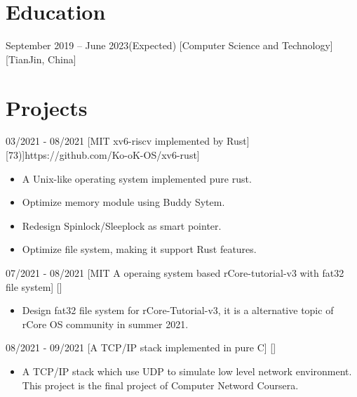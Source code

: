 \documentclass{chicv}
\begin{document}
\begin{basicinfo}
\end{basicinfo}

\section{Education}
  {September 2019 -- June 2023(Expected)}
  [Computer Science and Technology]
  [TianJin, China]



\section{Projects}

  {03/2021 - 08/2021}
  [MIT xv6-riscv implemented by Rust]
  [\iconlink[\faGithub][Ko-oK/xv6-rust(\faIcon[regular]{star}73)]{https://github.com/Ko-oK-OS/xv6-rust}]
  \begin{itemize}
    \item A Unix-like operating system implemented pure rust. 
    \item Optimize memory module using Buddy Sytem.
    \item Redesign Spinlock/Sleeplock as smart pointer.
    \item Optimize file system, making it support Rust features.
  \end{itemize}

  {07/2021 - 08/2021}
  [MIT A operaing system based rCore-tutorial-v3 with fat32 file system]
  []
  \begin{itemize}
    \item Design fat32 file system for rCore-Tutorial-v3, it is a alternative topic of rCore OS community in summer 2021.
  \end{itemize}

  {08/2021 - 09/2021}
  [A TCP/IP stack implemented in pure C]
  []
  \begin{itemize}
    \item A TCP/IP stack which use UDP to simulate low level network environment. This project is the final project of Computer Netword Coursera.
  \end{itemize}
\end{document}
